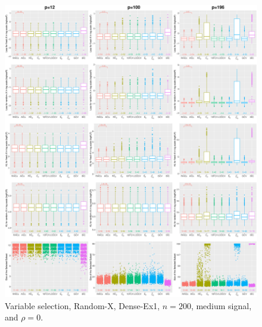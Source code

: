 \begin{figure}[!ht]
\centering
\includegraphics[width=\textwidth]{figures/supplement/randomx/subset_selection/Dense-Ex1_n200_msnr_rho0.eps}
\caption{Variable selection, Random-X, Dense-Ex1, $n=200$, medium signal, and $\rho=0$.}
\end{figure}
\clearpage
